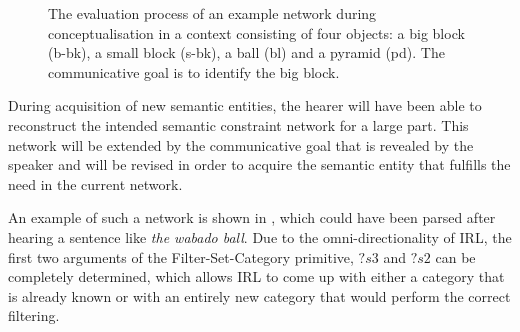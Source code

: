 \begin{figure}[htbp]
\centering
{}
\caption[Evaluation process of an example constraint
network]{ The evaluation process of an
  example network  during
  conceptualisation in a context consisting of four objects: a big
  block (b-bk), a small block (s-bk), a ball (bl) and a pyramid
  (pd). The communicative goal is to identify the big block.}
\label{f:evaluation}
\end{figure}

During acquisition of new semantic entities, the hearer will have been
able to reconstruct the intended semantic constraint network for a
large part. This network will be extended by the communicative goal
that is revealed by the speaker and will be revised in order to
acquire the semantic entity that fulfills the need in the current
network.

An example of such a network is shown in , which could have been parsed after hearing a
sentence like \textit{the wabado ball}. Due to the omni-directional\-ity of
IRL, the first two arguments of the {\sc Filter-Set-Category}
primitive, $?s3$ and $?s2$ can be completely determined, which allows
IRL to come up with either a category that is already known or with an
entirely new category that would perform the correct filtering.

